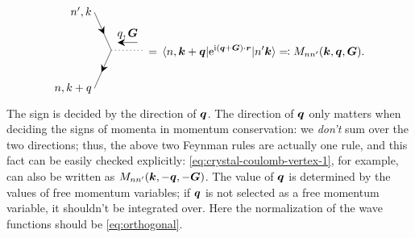 \documentclass[hyperref, a4paper, 12pt]{report}
\newcommand*{\ii}{\mathrm{i}}
\newcommand*{\ee}{\mathrm{e}}
\begin{document}
\begin{itemize}
\begin{equation}
\begin{gathered}
\begin{tikzpicture}[x=0.75pt,y=0.75pt,yscale=-1,xscale=1]
                \draw    (45.5,27.33) -- (65.5,72.17) ;
                \draw [shift={(57.05,53.22)}, rotate = 245.96] [fill={rgb, 255:red, 0; green, 0; blue, 0 }  ][line width=0.08]  [draw opacity=0] (8.93,-4.29) -- (0,0) -- (8.93,4.29) -- (5.93,0) -- cycle    ;
                \draw    (65.5,72.17) -- (45.5,117) ;
                \draw [shift={(53.95,98.05)}, rotate = 294.04] [fill={rgb, 255:red, 0; green, 0; blue, 0 }  ][line width=0.08]  [draw opacity=0] (8.93,-4.29) -- (0,0) -- (8.93,4.29) -- (5.93,0) -- cycle    ;
                \draw  [dash pattern={on 0.84pt off 2.51pt}]  (65.5,72.17) -- (105.5,72.17) ;
                \draw    (76,63) -- (96.5,63) ;
                \draw [shift={(73,63)}, rotate = 0] [fill={rgb, 255:red, 0; green, 0; blue, 0 }  ][line width=0.08]  [draw opacity=0] (8.93,-4.29) -- (0,0) -- (8.93,4.29) -- (5.93,0) -- cycle    ;
                
                \draw (84.75,60) node [anchor=south] [inner sep=0.75pt]    {$q, \vb*{G}$};
                \draw (43.5,27.33) node [anchor=east] [inner sep=0.75pt]    {$n', k$};
                \draw (43.5,117) node [anchor=east] [inner sep=0.75pt]    {$n, k+q$};
                \end{tikzpicture}                
        \end{gathered} = 
        \mel{n, \vb*{k} + \vb*{q}}{\ee^{\ii (\vb*{q} + \vb*{G}) \cdot \vb*{r}}}{n' \vb*{k}}
        \eqqcolon M_{n n'} (\vb*{k}, \vb*{q}, \vb*{G}) .
    \end{equation}
    The sign is decided by the direction of $\vb*{q}$.
    The direction of $\vb*{q}$ only matters 
    when deciding the signs of momenta in momentum conservation:
    we \emph{don't} sum over the two directions;
    thus, the above two Feynman rules 
    are actually one rule,
    and this fact can be easily checked explicitly:
    \eqref{eq:crystal-coulomb-vertex-1}, for example, 
    can also be written as $M_{nn'}(\vb*{k}, - \vb*{q}, - \vb*{G})$.
    The value of $\vb*{q}$ is determined by the values of free momentum variables;
    if $\vb*{q}$ is not selected as a free momentum variable, 
    it shouldn't be integrated over.
    Here the normalization of the wave functions should be \eqref{eq:orthogonal}.


\end{itemize}
\end{document}
